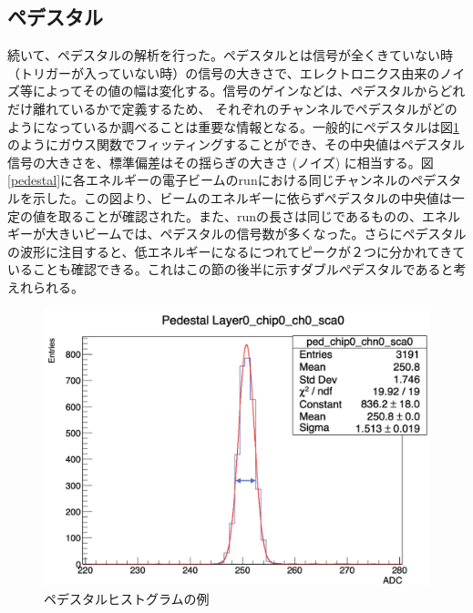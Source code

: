 \subsection{ペデスタル}
続いて、ペデスタルの解析を行った。ペデスタルとは信号が全くきていない時（トリガーが入っていない時）の信号の大きさで、エレクトロニクス由来のノイズ等によってその値の幅は変化する。信号のゲインなどは、ペデスタルからどれだけ離れているかで定義するため、 それぞれのチャンネルでペデスタルがどのようになっているか調べることは重要な情報となる。一般的にぺデスタルは図\ref{ped}のようにガウス関数でフィッティングすることができ、その中央値はペデスタル信号の大きさを、標準偏差はその揺らぎの大きさ (ノイズ) に相当する。図\ref{pedestal}に各エネルギーの電子ビームのrunにおける同じチャンネルのペデスタルを示した。この図より、ビームのエネルギーに依らずぺデスタルの中央値は一定の値を取ることが確認された。また、runの長さは同じであるものの、エネルギーが大きいビームでは、ペデスタルの信号数が多くなった。さらにペデスタルの波形に注目すると、低エネルギーになるにつれてピークが２つに分かれてきていることも確認できる。これはこの節の後半に示すダブルぺデスタルであると考えれられる。\\
\begin{figure}[H]
\begin{center}
 \includegraphics[keepaspectratio, scale=0.3]
 	{Figure/Beamtest/ped.png}
 		\caption{ペデスタルヒストグラムの例}
		\label{ped}
\end{center}
\end{figure}
